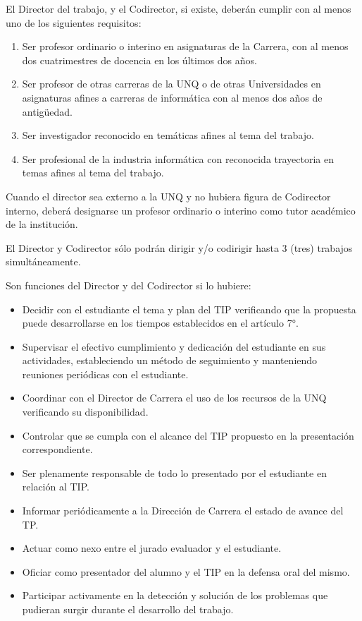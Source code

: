 \articulo El Director del trabajo, y el Codirector, si existe,
deberán cumplir con al menos uno de los siguientes requisitos:

\begin{enumerate}
\item Ser profesor ordinario o interino en asignaturas de la Carrera, con al
menos dos cuatrimestres de docencia en los últimos dos años.
\item Ser profesor de otras carreras de la UNQ o de otras Universidades en
asignaturas afines a carreras de informática con al menos dos años de
antigüedad.
\item Ser investigador reconocido en temáticas afines al tema del trabajo.
\item Ser profesional de la industria informática con reconocida trayectoria en
temas afines al tema del trabajo.
\end{enumerate}

\articulo Cuando el director sea externo a la UNQ y no hubiera figura de
Codirector interno, deberá designarse un profesor ordinario o interino como tutor
académico de la institución.

\articulo El Director y Codirector sólo podrán dirigir y/o codirigir hasta 3
(tres) trabajos simultáneamente. 

\articulo Son funciones del Director y del Codirector si lo hubiere:
\begin{itemize}
 \item Decidir con el estudiante el tema y plan del TIP verificando que la
 propuesta puede desarrollarse en los tiempos establecidos en el
 artículo 7°.
 \item Supervisar el efectivo cumplimiento y dedicación del estudiante en
 sus actividades, estableciendo un método de seguimiento y
 manteniendo reuniones periódicas con el estudiante.
 \item Coordinar con el Director de Carrera el uso de los recursos de la
 UNQ verificando su disponibilidad.
 \item Controlar que se cumpla con el alcance del TIP propuesto en la
 presentación correspondiente.
 \item Ser plenamente responsable de todo lo presentado por el
 estudiante en relación al TIP.
 \item Informar periódicamente a la Dirección de Carrera el estado de
 avance del TP.
 \item Actuar como nexo entre el jurado evaluador y el estudiante.
 \item Oficiar como presentador del alumno y el TIP en la defensa oral del
 mismo.
 \item Participar activamente en la detección y solución de los problemas
 que pudieran surgir durante el desarrollo del trabajo.
\end{itemize}


